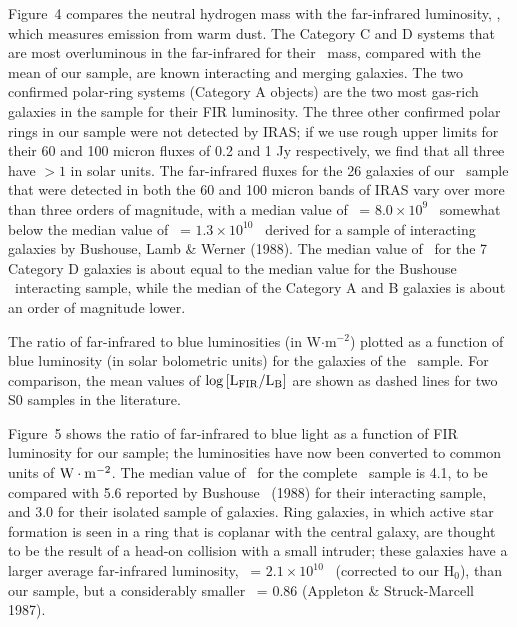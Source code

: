 Figure~4 compares the neutral hydrogen mass with the far-infrared
luminosity, \LFIR, which measures emission from warm dust.  
The Category C and D systems that are most overluminous in the far-infrared 
for their \HI\ mass, compared with the mean of our sample, are 
known interacting and merging galaxies.
The two confirmed polar-ring systems (Category A objects) are the two most 
gas-rich galaxies in the sample for their FIR luminosity.  The three other 
confirmed polar rings in our sample were not detected by IRAS; if we use 
rough upper limits for their 60 and 100 micron fluxes of 0.2 and 1 Jy 
respectively, we find that all three have \MHILFIR $> 1$ in solar units.  
The far-infrared fluxes for the 26 galaxies of our \ sample 
that were detected in both the 60 and 100 micron bands of IRAS vary over 
more than three orders of magnitude, with a median value of  
\LFIR\ = $8.0 \times 10^9$ \LSUN\ somewhat below the 
median value of \LFIR\ = $1.3 \times 10^{10}$ \LSUN\ derived for a 
sample of interacting galaxies by Bushouse, Lamb \& Werner (1988).  
The median value of \LFIR\ for the 7 Category D galaxies 
is about equal to the median value for the Bushouse \etal\ interacting
sample, while the median of the Category A and B galaxies is about an
order of magnitude lower. 

\bigskip
\centerline{}

\medskip
{\tenpt 
   
The ratio of far-infrared to blue luminosities 
(in W$\cdot$m$^{-2}$) plotted as a function of blue 
luminosity (in solar bolometric units) 
for the galaxies of the \ sample.  For comparison, the mean values of 
$\log{[\rm L_{\rm FIR}/L_{\rm B}]}$ 
are shown as dashed lines for two S0 samples in the literature.
}
\bigskip

Figure~5 shows the ratio of far-infrared to blue light as a function 
of FIR luminosity for our sample; the luminosities have now been
converted to common units of $\rm W\cdot m^{-2}$.
The median value of \LFIRLB\ for the complete 
\ sample is 4.1, to be compared with 
5.6 reported by Bushouse \etal\ (1988) for their interacting sample,
and 3.0 for their isolated sample of galaxies.  
Ring galaxies, in which active star formation is seen in a ring that is 
coplanar with the central galaxy, are thought to be the result of a 
head-on collision with a small intruder; these galaxies have a 
larger average far-infrared 
luminosity, \LFIR\ = $2.1 \times 10^{10}$ \LSUN\ (corrected to our H$_0$), 
than our sample, but a considerably smaller \LFIRLB\ = 0.86  
(Appleton \& Struck-Marcell 1987).

